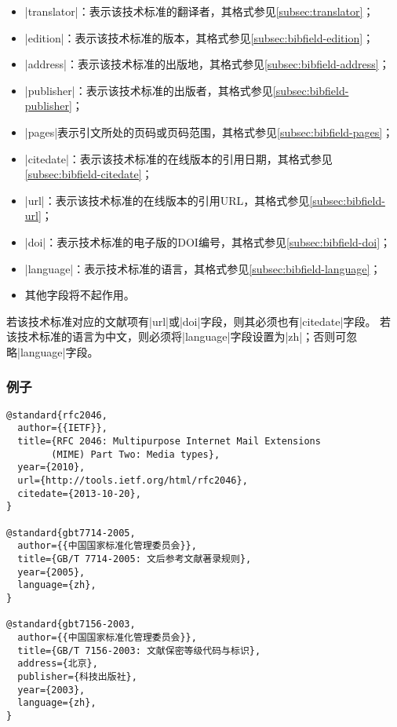 \begin{itemize}
\item |translator|：表示该技术标准的翻译者，其格式参见\ref{subsec:translator}；
\item |edition|：表示该技术标准的版本，其格式参见\ref{subsec:bibfield-edition}；
\item |address|：表示该技术标准的出版地，其格式参见\ref{subsec:bibfield-address}；
\item |publisher|：表示该技术标准的出版者，其格式参见\ref{subsec:bibfield-publisher}；
\item |pages|表示引文所处的页码或页码范围，其格式参见\ref{subsec:bibfield-pages}；
\item |citedate|：表示该技术标准的在线版本的引用日期，其格式参见\ref{subsec:bibfield-citedate}；
\item |url|：表示该技术标准的在线版本的引用URL，其格式参见\ref{subsec:bibfield-url}；
\item |doi|：表示技术标准的电子版的DOI编号，其格式参见\ref{subsec:bibfield-doi}；
\item |language|：表示技术标准的语言，其格式参见\ref{subsec:bibfield-language}；
\item 其他字段将不起作用。
\end{itemize}


\begin{note}
若该技术标准对应的文献项有|url|或|doi|字段，则其必须也有|citedate|字段。
若该技术标准的语言为中文，则必须将|language|字段设置为|zh|；否则可忽略|language|字段。
\end{note}

\subsubsection{例子}

\begin{verbatim}
@standard{rfc2046,
  author={{IETF}},
  title={RFC 2046: Multipurpose Internet Mail Extensions 
        (MIME) Part Two: Media types},
  year={2010},
  url={http://tools.ietf.org/html/rfc2046},
  citedate={2013-10-20},
}

@standard{gbt7714-2005,
  author={{中国国家标准化管理委员会}},
  title={GB/T 7714-2005: 文后参考文献著录规则},
  year={2005},
  language={zh},
}

@standard{gbt7156-2003,
  author={{中国国家标准化管理委员会}},
  title={GB/T 7156-2003: 文献保密等级代码与标识},
  address={北京},
  publisher={科技出版社},
  year={2003},
  language={zh},
}
\end{verbatim}

